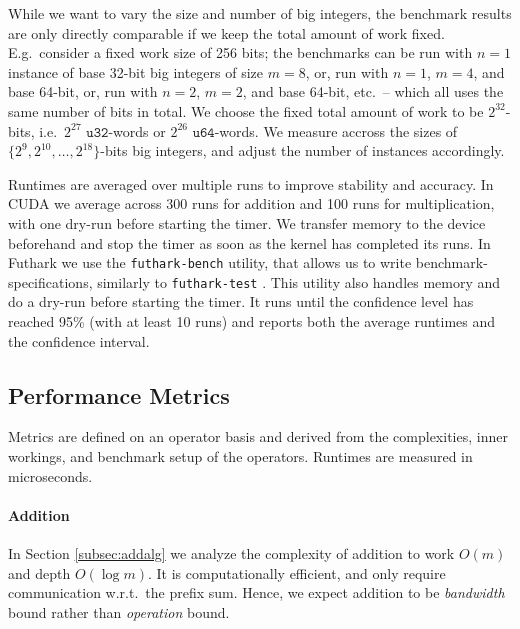 While we want to vary the size and number of big integers, the benchmark results
are only directly comparable if we keep the total amount of work fixed. E.g.\
consider a fixed work size of 256 bits; the benchmarks can be run with $n=1$
instance of base 32-bit big integers of size $m=8$, or, run with $n=1$, $m=4$,
and base 64-bit, or, run with $n=2$, $m=2$, and base 64-bit, etc.\ -- which all
uses the same number of bits in total. We choose the fixed total amount of work
to be $2^{32}$-bits, i.e.\ $2^{27}$ $\mathtt{u32}$-words or $2^{26}$
$\mathtt{u64}$-words. We measure accross the sizes of
$\{2^9,2^{10},\ldots,2^{18}\}$-bits big integers, and adjust the number of instances
accordingly.

Runtimes are averaged over multiple runs to improve stability and accuracy. In
CUDA we average across 300 runs for addition and 100 runs for multiplication,
with one dry-run before starting the timer. We transfer memory to the device
beforehand and stop the timer as soon as the kernel has completed its runs. In
Futhark we use the \texttt{futhark-bench} utility, that allows us to write
benchmark-specifications, similarly to \texttt{futhark-test}
\cite{futguide}. This utility also handles memory and do a dry-run before
starting the timer. It runs until the confidence level has reached 95\% (with at
least 10 runs) and reports both the average runtimes and the confidence
interval.

\subsection{Performance Metrics}
\label{subsec:perfmet}

Metrics are defined on an operator basis and derived from the complexities,
inner workings, and benchmark setup of the operators. Runtimes are measured in
microseconds.

\paragraph{Addition}
In Section \ref{subsec:addalg} we analyze the complexity of addition to work
$O(m)$ and depth $O(\log m)$. It is computationally efficient, and only require
communication w.r.t.\ the prefix sum. Hence, we expect addition to be
\textit{bandwidth} bound rather than \textit{operation} bound.


